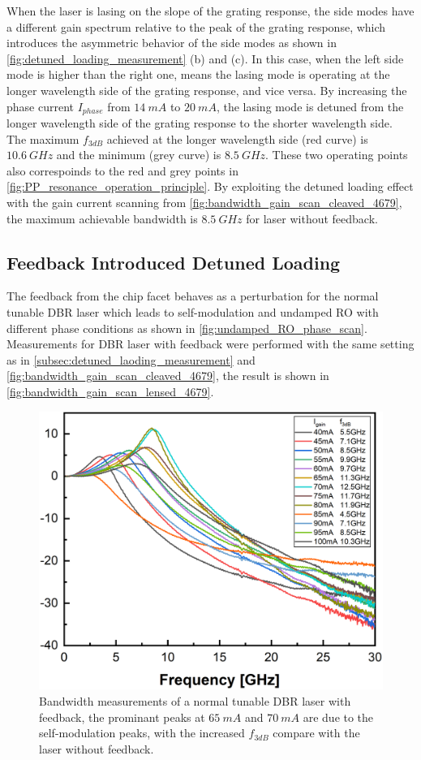 When the laser is lasing on the slope of the grating response, the side modes have a different gain spectrum relative to the peak of the grating response, which introduces the asymmetric behavior of the side modes as shown in \autoref{fig:detuned_loading_measurement} (b) and (c). In this case, when the left side mode is higher than the right one, means the lasing mode is operating at the longer wavelength side of the grating response, and vice versa. By increasing the phase current $I_{phase}$ from $14 \ mA$ to $20 \ mA$, the lasing mode is detuned from the longer wavelength side of the grating response to the shorter wavelength side. The maximum $f_{3dB}$ achieved at the longer wavelength side (red curve) is $10.6 \ GHz$ and the minimum (grey curve) is $8.5 \ GHz$. These two operating points also correspoinds to the red and grey points in \autoref{fig:PP_resonance_operation_principle}. By exploiting the detuned loading effect with the gain current scanning from \autoref{fig:bandwidth_gain_scan_cleaved_4679}, the maximum achievable bandwidth is $8.5 \ GHz$ for laser without feedback.

\subsection{Feedback Introduced Detuned Loading}\label{subsec:feedback_introduced_detuned_loading_measurement}
The feedback from the chip facet behaves as a perturbation for the normal tunable DBR laser which leads to self-modulation and undamped RO with different phase conditions as shown in \autoref{fig:undamped_RO_phase_scan}. Measurements for DBR laser with feedback were performed with the same setting as in \autoref{subsec:detuned_laoding_measurement} and \autoref{fig:bandwidth_gain_scan_cleaved_4679}, the result is shown in \autoref{fig:bandwidth_gain_scan_lensed_4679}.

\begin{figure}[ht]
    \centering
    \includegraphics[width=0.7\linewidth]{figures/bandwidth_gain_scan_lensed_4679.png}
    \caption{Bandwidth measurements of a normal tunable DBR laser with feedback, the prominant peaks at $65 \ mA$ and $70 \ mA$ are due to the self-modulation peaks, with the increased $f_{3dB}$ compare with the laser without feedback.}
    \label{fig:bandwidth_gain_scan_lensed_4679}
\end{figure}


